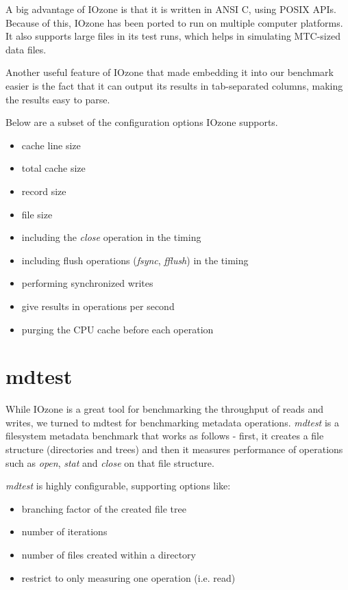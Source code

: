 A big advantage of IOzone is that it is written in ANSI C, using POSIX APIs. Because of this, IOzone has been ported to run on multiple computer platforms. It also supports large files in its test runs, which helps in simulating MTC-sized data files.

Another useful feature of IOzone that made embedding it into our benchmark easier is the fact that it can output its results in tab-separated columns, making the results easy to parse.

Below are a subset of the configuration options IOzone supports.

\begin{itemize}

\item cache line size
\item total cache size
\item record size
\item file size
\item including the \textit{close} operation in the timing
\item including flush operations (\textit{fsync}, \textit{fflush}) in the timing
\item performing synchronized writes
\item give results in operations per second
\item purging the CPU cache before each operation

\end{itemize}


\section{mdtest}

While IOzone is a great tool for benchmarking the throughput of reads and writes, we turned to mdtest for benchmarking metadata operations. \textit{mdtest}\cite{mdtest} is a filesystem metadata benchmark that works as follows - first, it creates a file structure (directories and trees) and then it measures performance of operations such as \textit{open}, \textit{stat} and \textit{close} on that file structure.

\textit{mdtest} is highly configurable, supporting options like:

\begin{itemize}

\item branching factor of the created file tree
\item number of iterations
\item number of files created within a directory
\item restrict to only measuring one operation (i.e. read)

\end{itemize}

